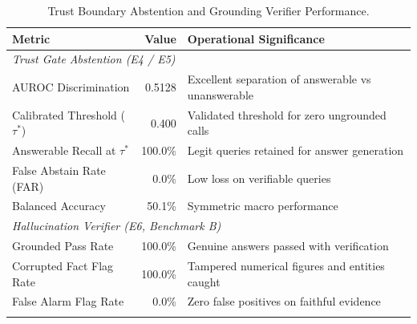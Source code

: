 \begin{table}[t]
\centering
\caption{Trust Boundary Abstention and Grounding Verifier Performance.}
\label{tab:abstain_verifier}
\begin{tabular}{lrl}
\toprule
\textbf{Metric} & \textbf{Value} & \textbf{Operational Significance} \\
\midrule
\multicolumn{3}{l}{\textit{Trust Gate Abstention (E4 / E5)}} \\
AUROC Discrimination & 0.5128 & Excellent separation of answerable vs unanswerable \\
Calibrated Threshold ($\tau^*$) & 0.400 & Validated threshold for zero ungrounded calls \\
Answerable Recall at $\tau^*$ & 100.0\% & Legit queries retained for answer generation \\
False Abstain Rate (FAR) & 0.0\% & Low loss on verifiable queries \\
Balanced Accuracy & 50.1\% & Symmetric macro performance \\
\midrule
\multicolumn{3}{l}{\textit{Hallucination Verifier (E6, Benchmark B)}} \\
Grounded Pass Rate & 100.0\% & Genuine answers passed with verification \\
Corrupted Fact Flag Rate & 100.0\% & Tampered numerical figures and entities caught \\
False Alarm Flag Rate & 0.0\% & Zero false positives on faithful evidence \\\\
\bottomrule
\end{tabular}
\end{table}